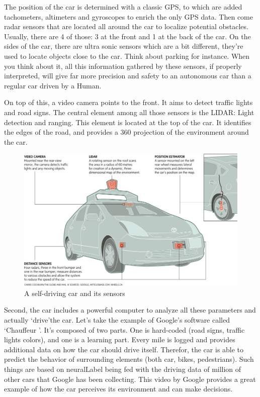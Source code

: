 \documentclass[12pt]{article}
\begin{document}
The position of the car is determined with a classic GPS, to which are added
tachometers, altimeters and gyroscopes to enrich the only GPS data. Then come
radar sensors that are located all around the car to localize potential
obstacles. Usually, there are 4 of those: 3 at the front and 1 at the back of
the car. On the sides of the car, there are ultra sonic sensors which are a bit
different, they're used to locate objects close to the car. Think about parking
for instance. When you think about it, all this information gathered by these sensors,
if properly interpreted, will give far more precision and safety to an autonomous car
than a regular car driven by a Human.

\noindent On top of this, a video camera points to the front. It aims to detect
traffic lights and road signs. The central element among all those sensors is
the LIDAR: Light detection and ranging. This element is located at the top of
the car. It identifies the edges of the road, and provides a 360 projection of
the environment around the car.

\smallskip

\begin{figure}[ht]
    \centering
    \includegraphics[width=\linewidth]{car-diagram}
    \caption{A self-driving car and its sensors}
    \label{fig:car}
\end{figure}

\smallskip

Second, the car includes a powerful computer to analyze all these parameters
and actually \lq drive\rq the car. Let's take the example of Google's software
called \lq Chauffeur \rq . It's composed of two parts. One is hard-coded
(road signs, traffic lights colors), and one is a learning part. Every mile is
logged and provides additional data on how the car should drive itself.
Therefor, the car is able to predict the behavior of surrounding elements
(both car, bikes, pedestrians). Such things are based on \gls{neuralLabel} being
fed with the driving data of million of other cars
that Google has been collecting. This video by Google provides a great example
of how the car perceives its environment and can make decisions.
\end{document}
